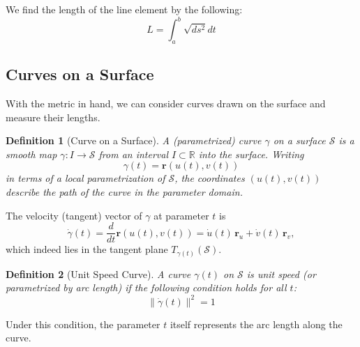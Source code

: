 \documentclass[12pt]{article}
\newtheorem{definition}{Definition}[section]
\begin{document}
We find the length of the line element by the following:
\[
	L = \int_{a}^{b} \sqrt{ds^{2}} dt
\]

\subsection{Curves on a Surface}
With the metric in hand, we can consider curves drawn on the surface and measure their lengths. 

\begin{definition}[Curve on a Surface]\label{def:curve}
A (parametrized) curve $\gamma$ on a surface $\mathcal{S}$ is a smooth map $\gamma: I \to \mathcal{S}$ from an interval $I\subset \mathbb{R}$ into the surface. 
Writing 
\begin{equation}\label{eq:curve-param}
	\gamma(t) = \mathbf{r}(u(t), v(t))
\end{equation}
in terms of a local parametrization of $\mathcal{S}$, the coordinates $(u(t), v(t))$ describe the path of the curve in the parameter domain. 
\end{definition}
The velocity (tangent) vector of $\gamma$ at parameter $t$ is 
\begin{equation}\label{eq:curve-vel}
	\dot\gamma(t) = \frac{d}{dt}\mathbf{r}(u(t), v(t)) = \dot{u}(t)\,\mathbf{r}_u + \dot{v}(t)\,\mathbf{r}_v,
\end{equation}
which indeed lies in the tangent plane $T_{\gamma(t)}(\mathcal{S})$. 


\begin{definition}[Unit Speed Curve]\label{def:unit-speed}
A curve $\gamma(t)$ on $\mathcal{S}$ is \emph{unit speed} (or parametrized by arc length) if the following condition holds for all $t$:
\[
\|\dot{\gamma}(t)\|^{2} = 1
\] 
\end{definition}

Under this condition, the parameter $t$ itself represents the arc length along the curve. 

\begingroup 
\color{blue}
\end{document}
